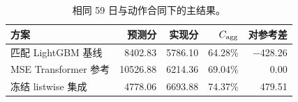 \begin{table}[!htbp]
\centering\small
\caption{相同 59 日与动作合同下的主结果。}\label{tab:main}
\begin{tabularx}{\linewidth}{@{}Xrrrr@{}}
\toprule
方案 & 预测分 & 实现分 & $C_{\rm agg}$ & 对参考差 \\
\midrule
匹配 LightGBM 基线 & 8402.83 & 5786.10 & 64.28\% & $-$428.26 \\
MSE Transformer 参考 & 10526.88 & 6214.36 & 69.04\% & 0.00 \\
冻结 listwise 集成 & 4778.06 & 6693.88 & 74.37\% & 479.51 \\
\bottomrule
\end{tabularx}
\par\vspace{3pt}{\footnotesize 所有分数均为日均原始调度分数。共同 oracle 为 9000.89；预测分与实现分分开列示，不把预测值当成结算结果。}
\end{table}
